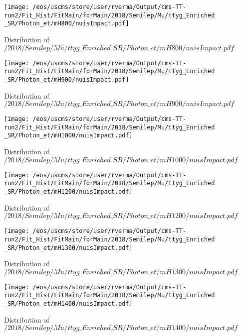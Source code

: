 \begin{figure}
\centering
\texttt{[image: /eos/uscms/store/user/rverma/Output/cms-TT-run2/Fit\_Hist/FitMain/forMain/2018/Semilep/Mu/ttyg\_Enriched\_SR/Photon\_et/mH800/nuisImpact.pdf]}
\caption{Distribution of $/2018/Semilep/Mu/ttyg\_Enriched\_SR/Photon\_et/mH800/nuisImpact.pdf$}
\end{figure}

\begin{figure}
\centering
\texttt{[image: /eos/uscms/store/user/rverma/Output/cms-TT-run2/Fit\_Hist/FitMain/forMain/2018/Semilep/Mu/ttyg\_Enriched\_SR/Photon\_et/mH900/nuisImpact.pdf]}
\caption{Distribution of $/2018/Semilep/Mu/ttyg\_Enriched\_SR/Photon\_et/mH900/nuisImpact.pdf$}
\end{figure}

\begin{figure}
\centering
\texttt{[image: /eos/uscms/store/user/rverma/Output/cms-TT-run2/Fit\_Hist/FitMain/forMain/2018/Semilep/Mu/ttyg\_Enriched\_SR/Photon\_et/mH1000/nuisImpact.pdf]}
\caption{Distribution of $/2018/Semilep/Mu/ttyg\_Enriched\_SR/Photon\_et/mH1000/nuisImpact.pdf$}
\end{figure}

\begin{figure}
\centering
\texttt{[image: /eos/uscms/store/user/rverma/Output/cms-TT-run2/Fit\_Hist/FitMain/forMain/2018/Semilep/Mu/ttyg\_Enriched\_SR/Photon\_et/mH1200/nuisImpact.pdf]}
\caption{Distribution of $/2018/Semilep/Mu/ttyg\_Enriched\_SR/Photon\_et/mH1200/nuisImpact.pdf$}
\end{figure}

\begin{figure}
\centering
\texttt{[image: /eos/uscms/store/user/rverma/Output/cms-TT-run2/Fit\_Hist/FitMain/forMain/2018/Semilep/Mu/ttyg\_Enriched\_SR/Photon\_et/mH1300/nuisImpact.pdf]}
\caption{Distribution of $/2018/Semilep/Mu/ttyg\_Enriched\_SR/Photon\_et/mH1300/nuisImpact.pdf$}
\end{figure}

\begin{figure}
\centering
\texttt{[image: /eos/uscms/store/user/rverma/Output/cms-TT-run2/Fit\_Hist/FitMain/forMain/2018/Semilep/Mu/ttyg\_Enriched\_SR/Photon\_et/mH1400/nuisImpact.pdf]}
\caption{Distribution of $/2018/Semilep/Mu/ttyg\_Enriched\_SR/Photon\_et/mH1400/nuisImpact.pdf$}
\end{figure}

